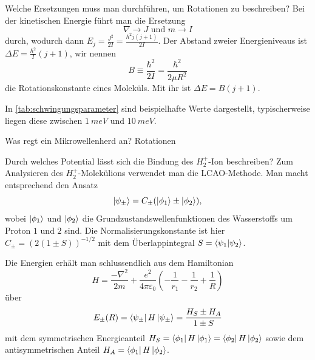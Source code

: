 
\begin{fquestion}{Welche Ersetzungen muss man durchführen, um Rotationen zu beschreiben?}
    Bei der kinetischen Energie führt man die Ersetzung 
    $$\nabla \rightarrow J \text{ und } m \rightarrow I$$
    durch, wodurch dann $E_j = \frac{J^2}{2I} = \frac{\hbar^2 j (j + 1)}{2I}$.
    Der Abstand zweier Energieniveaus ist $\Delta E = \frac{\hbar^2}{I} (j + 1)$, wir nennen 
    $$B \equiv \frac{\hbar^2}{2 I} = \frac{\hbar^2}{2 \mu R^2}$$
    die Rotationskonstante eines Moleküls.
    Mit ihr ist $\Delta E = B (j + 1)$.
    
    In \autoref{tab:schwingungsparameter} sind beispielhafte Werte dargestellt, typischerweise liegen diese zwischen $\SI{1}{meV}$ und $\SI{10}{meV}$.
\end{fquestion}


\begin{fquestion}{Was regt ein Mikrowellenherd an?}
    Rotationen
\end{fquestion}

\begin{fquestion}{Durch welches Potential lässt sich die Bindung des $H_2^+$-Ion beschreiben?}
    Zum Analysieren des $H_2^+$-Molekülions verwendet man die LCAO-Methode.
    Man macht entsprechend den Ansatz
    $$\ket{\psi_\pm} = C_\pm (\ket{\phi_1} \pm \ket{\phi_2}),$$
    wobei $\ket{\phi_1}$ und $\ket{\phi_2}$ die Grundzustandswellenfunktionen des Wasserstoffs um Proton $1$ und $2$ sind.
    Die Normalisierungskonstante ist hier $C_\pm = \left(2 (1 \pm S)\right)^{-1 / 2}$ mit dem Überlappintegral $S = \braket{\psi_1}{\psi_2}$.
    
    Die Energien erhält man schlussendlich aus dem Hamiltonian 
    $$H = \frac{-\nabla^2}{2m} + \frac{e^2}{4 \pi \varepsilon_0} \left(-\frac{1}{r_1} - \frac{1}{r_2} + \frac{1}{R}\right)$$
    über 
    $$E_\pm(R) = \bra{\psi_\pm} H \ket{\psi_\pm} = \frac{H_S \pm H_A}{1 \pm S}$$
    mit dem symmetrischen Energieanteil $H_S = \bra{\phi_1} H \ket{\phi_1} = \bra{\phi_2} H \ket{\phi_2}$ sowie dem antisymmetrischen Anteil $H_A = \bra{\phi_1} H \ket{\phi_2}$.
\end{fquestion}

